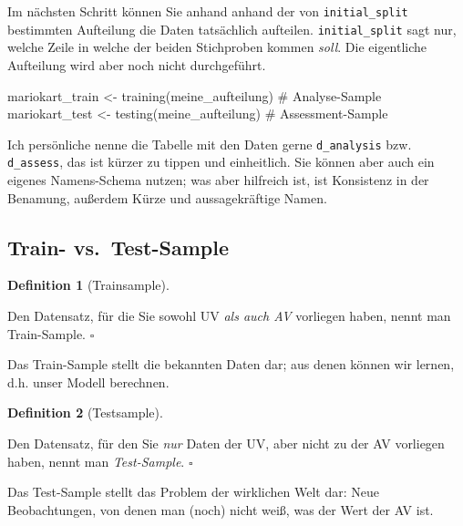 \documentclass[
  letterpaper,
  oneside,
  open=any]{scrbook}
\newenvironment{Shaded}{\begin{snugshade}}{\end{snugshade}}
\newcommand{\CommentTok}[1]{\textcolor[rgb]{0.37,0.37,0.37}{#1}}
\newcommand{\FunctionTok}[1]{\textcolor[rgb]{0.28,0.35,0.67}{#1}}
\newcommand{\NormalTok}[1]{\textcolor[rgb]{0.00,0.23,0.31}{#1}}
\newcommand{\OtherTok}[1]{\textcolor[rgb]{0.00,0.23,0.31}{#1}}
\theoremstyle{definition}
\theoremstyle{definition}
\theoremstyle{definition}
\newtheorem{definition}{Definition}[chapter]
\theoremstyle{remark}
\begin{document}
Im nächsten Schritt können Sie anhand anhand der von
\texttt{initial\_split} bestimmten Aufteilung die Daten tatsächlich
aufteilen. \texttt{initial\_split} sagt nur, welche Zeile in welche der
beiden Stichproben kommen \emph{soll}. Die eigentliche Aufteilung wird
aber noch nicht durchgeführt.

\begin{Shaded}
\begin{Highlighting}[]
\NormalTok{mariokart\_train }\OtherTok{\textless{}{-}} 
  \FunctionTok{training}\NormalTok{(meine\_aufteilung)  }\CommentTok{\# Analyse{-}Sample}
\NormalTok{mariokart\_test }\OtherTok{\textless{}{-}} 
  \FunctionTok{testing}\NormalTok{(meine\_aufteilung)  }\CommentTok{\# Assessment{-}Sample}
\end{Highlighting}
\end{Shaded}

Ich persönliche nenne die Tabelle mit den Daten gerne
\texttt{d\_analysis} bzw. \texttt{d\_assess}, das ist kürzer zu tippen
und einheitlich. Sie können aber auch ein eigenes Namens-Schema nutzen;
was aber hilfreich ist, ist Konsistenz in der Benamung, außerdem Kürze
und aussagekräftige Namen.

\subsection{Train- vs.~Test-Sample}\label{train--vs.-test-sample}

\begin{definition}[Trainsample]\protect\hypertarget{def-trainsample}{}\label{def-trainsample}

Den Datensatz, für die Sie sowohl UV \emph{als auch AV} vorliegen haben,
nennt man Train-Sample. \(\square\)

\end{definition}

Das Train-Sample stellt die bekannten Daten dar; aus denen können wir
lernen, d.h. unser Modell berechnen.

\begin{definition}[Testsample]\protect\hypertarget{def-testsample}{}\label{def-testsample}

Den Datensatz, für den Sie \emph{nur} Daten der UV, aber nicht zu der AV
vorliegen haben, nennt man \emph{Test-Sample}. \(\square\)

\end{definition}

Das Test-Sample stellt das Problem der wirklichen Welt dar: Neue
Beobachtungen, von denen man (noch) nicht weiß, was der Wert der AV ist.
\end{document}
